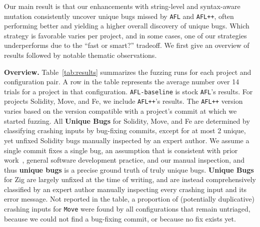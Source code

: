 Our main result is that our enhancements with string-level and syntax-aware
mutation consistently uncover unique bugs missed by \texttt{AFL} and
\texttt{AFL++}, often performing better and yielding a higher overall discovery
of unique bugs. Which strategy is favorable varies per project, and in some
cases, one of our strategies underperforms due to the ``fast or smart?''
tradeoff. We first give an overview of results followed by notable
thematic observations.

\noindent \textbf{Overview.} Table~\ref{tab:results} summarizes the fuzzing
runs for each project and configuration pair. A row in the table represents the
average number over 14 trials for a project in that configuration.
\texttt{AFL-baseline} is stock \texttt{AFL}'s results. For projects Solidity,
Move, and Fe, we include \texttt{AFL++}'s results. The \texttt{AFL++} version
varies based on the version compatible with a project's commit at which we
started fuzzing. All \textbf{Unique Bugs} for Solidity, Move, and Fe are
determined by classifying crashing inputs by bug-fixing commits, except for at
most 2 unique, yet unfixed Solidity bugs manually inspected by an expert
author. We assume a single commit fixes a single bug, an assumption that is
consistent with prior work~\cite{semantic-crash-bucketing,Taming}, general
software development practice, and our manual inspection, and thus \textbf{unique
bugs} is a precise ground truth of truly unique bugs. \textbf{Unique Bugs} for
Zig are largely unfixed at the time of writing, and are instead comprehensively
classified by an expert author manually inspecting every crashing input and its
error message. Not reported in the table, a proportion of (potentially
duplicative) crashing inputs for \texttt{Move} were found by all configurations
that remain untriaged, because we could not find a bug-fixing commit, or
because no fix exists yet.

